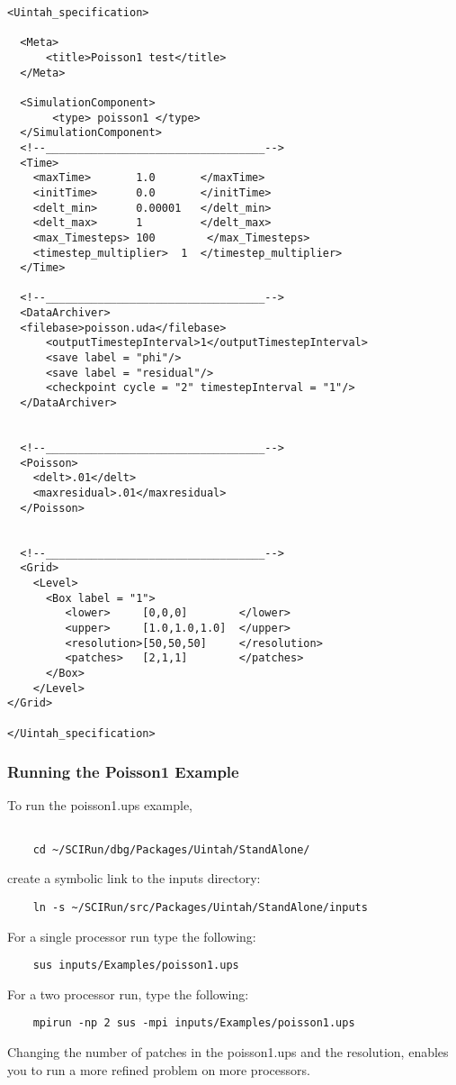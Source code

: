 \documentclass[12pt]{report}
\begin{document}
\begin{verbatim}
<Uintah_specification>

  <Meta>
      <title>Poisson1 test</title>
  </Meta>

  <SimulationComponent>
       <type> poisson1 </type>
  </SimulationComponent>
  <!--__________________________________-->
  <Time>
    <maxTime>       1.0       </maxTime>
    <initTime>      0.0       </initTime>
    <delt_min>      0.00001   </delt_min>
    <delt_max>      1         </delt_max>
    <max_Timesteps> 100        </max_Timesteps>
    <timestep_multiplier>  1  </timestep_multiplier>
  </Time>

  <!--__________________________________-->
  <DataArchiver>
  <filebase>poisson.uda</filebase>
      <outputTimestepInterval>1</outputTimestepInterval>
      <save label = "phi"/>
      <save label = "residual"/>
      <checkpoint cycle = "2" timestepInterval = "1"/>
  </DataArchiver>


  <!--__________________________________-->
  <Poisson>
    <delt>.01</delt>
    <maxresidual>.01</maxresidual>
  </Poisson>


  <!--__________________________________-->
  <Grid>
    <Level>
      <Box label = "1">
         <lower>     [0,0,0]        </lower>
         <upper>     [1.0,1.0,1.0]  </upper>
         <resolution>[50,50,50]     </resolution>
         <patches>   [2,1,1]        </patches>
      </Box>
    </Level>
</Grid>

</Uintah_specification>

\end{verbatim}


\subsubsection{Running the Poisson1 Example}

To run the poisson1.ups example, 
\begin{verbatim}

	cd ~/SCIRun/dbg/Packages/Uintah/StandAlone/
\end{verbatim}

create a symbolic link to the inputs directory:
\begin{verbatim}
	ln -s ~/SCIRun/src/Packages/Uintah/StandAlone/inputs
\end{verbatim}
For a single processor run type the following:
\begin{verbatim}
	sus inputs/Examples/poisson1.ups
\end{verbatim}
For a two processor run, type the following:
\begin{verbatim}
	mpirun -np 2 sus -mpi inputs/Examples/poisson1.ups
\end{verbatim}
Changing the number of patches in the poisson1.ups and the resolution,
enables you to run a more refined problem on more processors.
\end{document}
